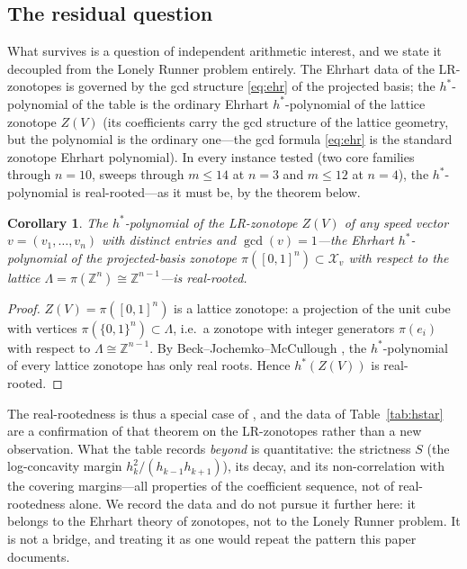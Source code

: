 \documentclass[11pt,a4paper]{article}
\numberwithin{equation}{section}
\theoremstyle{plain}
\newtheorem{corollary}[theorem]{Corollary}
\theoremstyle{definition}
\theoremstyle{remark}
\newcommand{\Z}{\mathbb{Z}}
\begin{document}
\subsection{The residual question}

What survives is a question of independent arithmetic interest, and we
state it decoupled from the Lonely Runner problem entirely. The
Ehrhart data of the LR-zonotopes is governed by the gcd structure
\eqref{eq:ehr} of the projected basis; the $h^*$-polynomial of the table
is the ordinary Ehrhart $h^*$-polynomial of the lattice zonotope $Z(V)$
(its coefficients carry the gcd structure of the lattice geometry, but
the polynomial is the ordinary one---the gcd formula \eqref{eq:ehr} is
the standard zonotope Ehrhart polynomial). In every instance tested (two
core families through $n=10$, sweeps through $m\le14$ at $n=3$ and
$m\le12$ at $n=4$), the $h^*$-polynomial is real-rooted---as it must be,
by the theorem below.

\begin{corollary}\label{cor:hstarRR}
The $h^*$-polynomial of the LR-zonotope $Z(V)$ of any speed vector
$v=(v_1,\dots,v_n)$ with distinct entries and $\gcd(v)=1$---the
Ehrhart $h^*$-polynomial of the projected-basis zonotope
$\pi([0,1]^n)\subset\mathcal{X}_v$ with respect to the lattice
$\Lambda=\pi(\Z^n)\cong\Z^{n-1}$---is real-rooted.
\end{corollary}

\begin{proof}
$Z(V)=\pi([0,1]^n)$ is a lattice zonotope: a projection of the unit cube
with vertices $\pi(\{0,1\}^n)\subset\Lambda$, i.e.\ a zonotope with
integer generators $\pi(e_i)$ with respect to $\Lambda\cong\Z^{n-1}$. By
Beck--Jochemko--McCullough \cite{BJM}, the $h^*$-polynomial of every
lattice zonotope has only real roots. Hence $h^*(Z(V))$ is real-rooted.
\end{proof}

The real-rootedness is thus a special case of \cite{BJM}, and the data
of Table~\ref{tab:hstar} are a confirmation of that theorem on the
LR-zonotopes rather than a new observation. What the table records
\emph{beyond} \cite{BJM} is quantitative: the strictness $S$ (the
log-concavity margin $h_k^2/(h_{k-1}h_{k+1})$), its decay, and its
non-correlation with the covering margins---all properties of the
coefficient sequence, not of real-rootedness alone. We record the data
and do not pursue it further here: it belongs to the Ehrhart theory of
zonotopes, not to the Lonely Runner problem. It is not a bridge, and
treating it as one would repeat the pattern this paper documents.
\end{document}
